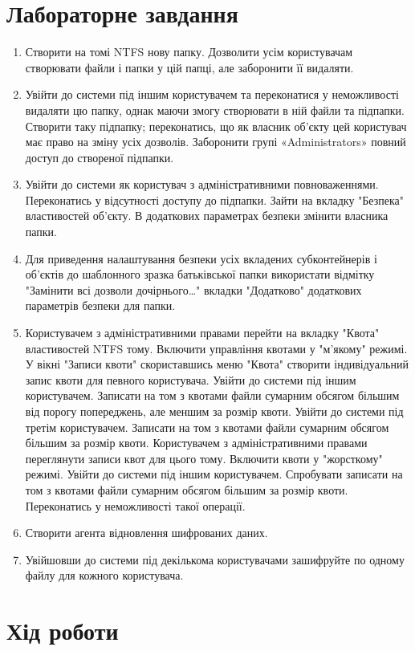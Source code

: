 \documentclass[oneside,14pt]{extarticle}
\begin{document}
\begin{normalsize}
    \section*{Лабораторне завдання}
	\begin{enumerate}
		\item Створити на томі NTFS нову папку. Дозволити усім користувачам створювати файли і папки у цій папці, але заборонити її видаляти.
		\item Увійти до системи під іншим користувачем та переконатися у неможливості видаляти цю папку, однак маючи
		змогу створювати в ній файли та підпапки. Створити таку підпапку;
		переконатись, що як власник об’єкту цей користувач має право на зміну усіх
		дозволів. Заборонити групі «Administrators» повний доступ до створеної
		підпапки.
		\item Увійти до системи як користувач з адміністративними повноваженнями.
		Переконатись у відсутності доступу до підпапки. Зайти на вкладку "Безпека" властивостей об’єкту. В додаткових
		параметрах безпеки змінити власника папки.
		\item Для приведення налаштування безпеки усіх вкладених субконтейнерів і
		об’єктів до шаблонного зразка батьківської папки використати відмітку
		"Замінити всі дозволи дочірнього…" вкладки "Додатково" додаткових
		параметрів безпеки для папки.
		\item Користувачем з адміністративними правами перейти на вкладку "Квота"
		властивостей NTFS тому. Включити управління квотами у "м’якому" режимі. У
		вікні "Записи квоти" скориставшись меню "Квота" створити
		індивідуальний запис квоти для певного користувача. Увійти до системи під іншим користувачем. Записати на том з квотами
		файли сумарним обсягом більшим від порогу попереджень, але меншим за
		розмір квоти.
		Увійти до системи під третім користувачем. Записати на том з квотами
		файли сумарним обсягом більшим за розмір квоти.
		Користувачем з адміністративними правами переглянути записи квот для
		цього тому. Включити квоти у "жорсткому" режимі.
		Увійти до системи під іншим користувачем. Спробувати записати на том з
		квотами файли сумарним обсягом більшим за розмір квоти. Переконатись у
		неможливості такої операції.
		\item Створити агента відновлення шифрованих даних.
		\item Увійшовши до системи під декількома користувачами зашифруйте по
		одному файлу для кожного користувача. 
	\end{enumerate}

	\section*{Хід роботи}
	

\end{normalsize}
\end{document}
